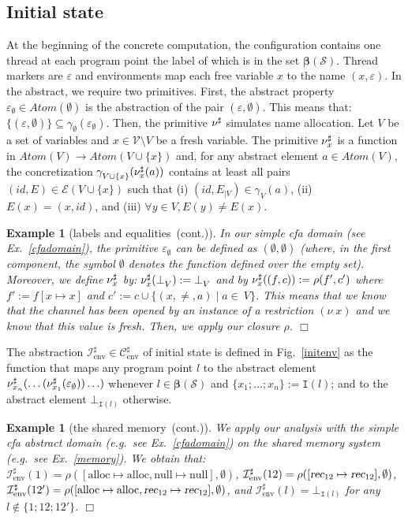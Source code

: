 \documentclass{article}
\newcommand{\bydef}{:=}
\newcommand{\boxexample}{$\Box$}
\newtheorem{example}[thm]{Example}
\newcommand{\Names}{\mathcal{V}}
\newcommand{\nuu}{\nu\;}
\newcommand{\globalname}[1]{\mathrm{#1}}
\newcommand{\recur}[1]{{\textsl{#1}}}
\newcommand{\ccreate}{\globalname{alloc}}
\newcommand{\cnull}{\globalname{null}}
\newcommand{\memlaba}{1}
\newcommand{\memlabl}{12}
\newcommand{\crec}{\recur{rec}}
\newcommand{\emptyfun}{\emptyset}
\newcommand{\System}{\mathcal{S}}
\newcommand{\interface}{\mathtt{I}}
\newcommand{\Extract}{\mathbf{\beta}}
\newcommand{\env}[1]{\mathcal{E}(#1)}
\newcommand{\continued}{(cont.)}
\newcommand{\ainit}[1]{\mathcal{I}_{#1}^{\sharp}}
\newcommand{\Atomekey}{\textit{Atom}}
\newcommand{\Atomeshortkey}{}
\newcommand{\Atome}[1]{\Atomekey(#1)}
\newcommand{\gammaatome}[1]{\gamma^{\Atomeshortkey}_{#1}}
\newcommand{\botatome}[1]{\bot^{\Atomeshortkey}_{#1}}
\newcommand{\Envkey}{\mathrm{env}}
\newcommand{\Envdom}{\mathcal{C}^{\sharp}_{\Envkey}}
\newcommand{\jdeclare}{{\bf \nu}^{\sharp}}
\newcommand{\declare}{\jdeclare}
\newcommand{\initenv}{\ainit{\Envkey}}
\newcommand{\cfadomain}{labels and equalities}
\newcommand{\ccfadomain}{\cfadomain\ \continued}
\newcommand{\shareanalysis}{the shared memory}
\newcommand{\cflowanalysis}{\shareanalysis\ \continued}
\begin{document}
\subsection{Initial state}
At the beginning of the concrete computation, 
the configuration contains one thread at each program point the label of which is in the set $\Extract(\System)$. Thread markers are $\varepsilon$ and environments map each free variable $x$ to the name $(x,\varepsilon)$. In the abstract, we require two primitives.
First, the abstract property $\varepsilon_{\emptyset}\in\Atome{\emptyset}$ is the abstraction of the pair $(\varepsilon,\emptyset)$. This means that:  $\{(\varepsilon,\emptyset)\}\subseteq\gammaatome{\emptyset}(\varepsilon_\emptyset)$.
Then, the  primitive $\jdeclare$ simulates name allocation. 
Let $V$ be a set of variables and $x\in\Names\setminus V$ be a fresh variable. 
The primitive $\declare_x$ is a function in $\Atome{V}\rightarrow \Atome{V\cup\{x\}}$ and, for any abstract element $a\in \Atome{V}$, 
the concretization $\gammaatome{V\cup \{x\}}(\declare_x(a))$ contains at least all pairs  $(\textit{id},E)\in \env{V\cup \{x\}}$ such that (i) $(\textit{id},E_{|V})\in\gamma_V(a)$, (ii) $E(x)=(x,\textit{id})$, and (iii) $\forall y\in V, E(y)\not = E(x)$.

\begin{example}[\ccfadomain]
In our simple \emph{cfa} domain (see Ex.~\ref{cfadomain}), 
the primitive $\varepsilon_{\emptyset}$ can be defined as $(\emptyfun,\emptyset)$ (where, in the first component, the symbol $\emptyfun$ denotes the function defined over the empty set). Moreover, we define $\declare_x$ by: 
$\declare_x(\botatome{V})\bydef\botatome{V}$  and by $\declare_x((f,c))\bydef\rho(f',c')$ where $f'\bydef f[x\mapsto x]$ and $c'\bydef c\cup \{(x,\not=,a)\;|\;a\in\ V\}$. This means that we know that the channel has been opened by an instance of a restriction $(\nuu x)$ and we know that this value is fresh. Then, we apply our closure $\rho$.
\boxexample\end{example}

The abstraction $\initenv\in\Envdom$ of initial state is defined in Fig.~\ref{initenv} as the function that maps any program point $l$ to the abstract element $\declare_{x_n}(\ldots(\declare_{x_1}(\varepsilon_{\emptyset}))\ldots)$ whenever 
$l\in\Extract(\System)$ and $\{x_1;\ldots;x_n\}\bydef \interface(l)$; 
and to the abstract element $\botatome{\interface(l)}$ otherwise.

\begin{example}[\cflowanalysis]
We apply our analysis with the simple \emph{cfa} abstract domain (e.g.~see Ex.~\ref{cfadomain}) on the shared memory system (e.g.~see Ex.~\ref{memory}).
We obtain that: $\initenv(\memlaba)=\rho([\ccreate \mapsto \ccreate,\cnull \mapsto \cnull],\emptyset)$, $\initenv(\memlabl)=\rho([\crec_{\memlabl}\mapsto \crec_{\memlabl}],\emptyset)$, $\initenv(\memlabl')=\rho([\ccreate\mapsto \ccreate,\crec_{\memlabl}\mapsto \crec_{\memlabl}],\emptyset)$, and $\initenv(l)=\botatome{\interface(l)}$ 
for any $l\not\in\{\memlaba;\memlabl;\memlabl'\}$.
\boxexample\end{example}
\end{document}
